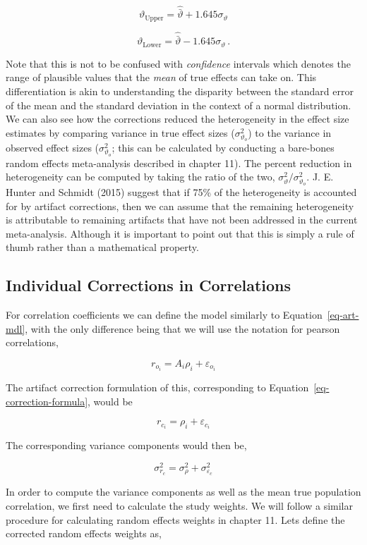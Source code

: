 \documentclass[
  letterpaper,
  DIV=11,
  numbers=noendperiod]{scrreprt}
\begin{document}
\[
\vartheta_{\text{Upper}} = \hat{\bar{\vartheta}} + 1.645\sigma_\vartheta
\]

\[
\vartheta_{\text{Lower}} = \hat{\bar{\vartheta}} - 1.645\sigma_\vartheta\, .
\]

Note that this is not to be confused with \emph{confidence} intervals
which denotes the range of plausible values that the \emph{mean} of true
effects can take on. This differentiation is akin to understanding the
disparity between the standard error of the mean and the standard
deviation in the context of a normal distribution. We can also see how
the corrections reduced the heterogeneity in the effect size estimates
by comparing variance in true effect sizes (\(\sigma^2_{\vartheta_o}\))
to the variance in observed effect sizes (\(\sigma^2_{\vartheta_o}\);
this can be calculated by conducting a bare-bones random effects
meta-analysis described in chapter 11). The percent reduction in
heterogeneity can be computed by taking the ratio of the two,
\(\sigma^2_{\vartheta}/\sigma^2_{\vartheta_o}\). J. E. Hunter and
Schmidt (2015) suggest that if 75\% of the heterogeneity is accounted
for by artifact corrections, then we can assume that the remaining
heterogeneity is attributable to remaining artifacts that have not been
addressed in the current meta-analysis. Although it is important to
point out that this is simply a rule of thumb rather than a mathematical
property.

\subsection{Individual Corrections in
Correlations}\label{individual-corrections-in-correlations}

For correlation coefficients we can define the model similarly to
Equation~\ref{eq-art-mdl}, with the only difference being that we will
use the notation for pearson correlations,

\[
r_{o_i} = A_i\rho_i + \varepsilon_{o_i}
\]

The artifact correction formulation of this, corresponding to
Equation~\ref{eq-correction-formula}, would be

\[
r_{c_i} = \rho_i + \varepsilon_{c_i}
\]

The corresponding variance components would then be,

\[
\sigma^2_{r_c} = \sigma^2_\rho + \sigma^2_{\varepsilon_c}
\]

In order to compute the variance components as well as the mean true
population correlation, we first need to calculate the study weights. We
will follow a similar procedure for calculating random effects weights
in chapter 11. Lets define the corrected random effects weights as,
\end{document}
